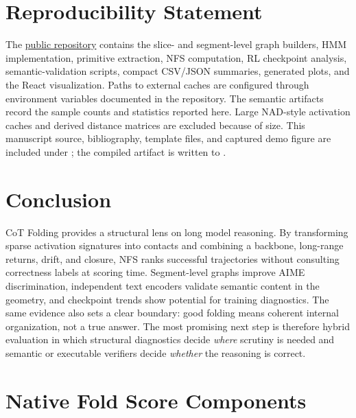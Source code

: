\documentclass{article}
\newcommand{\nfs}{\textsc{NFS}}
\newcommand{\repo}{\href{https://github.com/JunjieNian/cot_folding_demo}{public repository}}
\begin{document}
\section{Reproducibility Statement}

The \repo{} contains the slice- and segment-level graph builders, HMM implementation, primitive extraction, \nfs{} computation, RL checkpoint analysis, semantic-validation scripts, compact CSV/JSON summaries, generated plots, and the React visualization. Paths to external caches are configured through environment variables documented in the repository. The semantic artifacts record the sample counts and statistics reported here. Large NAD-style activation caches and derived distance matrices are excluded because of size. This manuscript source, bibliography, template files, and captured demo figure are included under ; the compiled artifact is written to .

\section{Conclusion}

CoT Folding provides a structural lens on long model reasoning. By transforming sparse activation signatures into contacts and combining a backbone, long-range returns, drift, and closure, \nfs{} ranks successful trajectories without consulting correctness labels at scoring time. Segment-level graphs improve AIME discrimination, independent text encoders validate semantic content in the geometry, and checkpoint trends show potential for training diagnostics. The same evidence also sets a clear boundary: good folding means coherent internal organization, not a true answer. The most promising next step is therefore hybrid evaluation in which structural diagnostics decide \emph{where} scrutiny is needed and semantic or executable verifiers decide \emph{whether} the reasoning is correct.




\appendix

\section{Native Fold Score Components}
\end{document}

